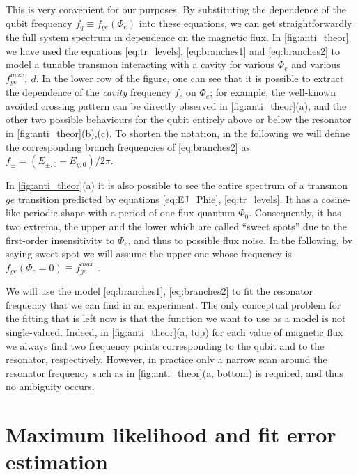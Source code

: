 \documentclass[%
 aip,
 draft,
 amsmath,amssymb,
 reprint,%
]{revtex4-1}
\begin{document}
This is very convenient for our purposes. By substituting the dependence of the qubit frequency $f_q \equiv f_{ge}(\Phi_e)$ into these equations, we can get straightforwardly the full system spectrum in dependence on the magnetic flux. In \autoref{fig:anti_theor} we have used the equations \eqref{eq:tr_levels}, \eqref{eq:branches1} and \eqref{eq:branches2} to model a tunable transmon interacting with a cavity for various $\Phi_e$ and various $f_{ge}^{max},\ d$. In the lower row of the figure, one can see that it is possible to extract the dependence of the \textit{cavity} frequency $f_c$ on $\Phi_e$; for example, the well-known avoided crossing pattern can be directly observed in \autoref{fig:anti_theor}(a), and the other two possible behaviours for the qubit entirely above or below the resonator in \autoref{fig:anti_theor}(b),(c). To shorten the notation, in the following we will define the corresponding branch frequencies of \eqref{eq:branches2} as $f_{\pm} = ( E_{\pm,0}-E_{g,0})/2\pi$.

In \autoref{fig:anti_theor}(a) it is also possible to see the entire spectrum of a transmon $ge$ transition predicted by equations \eqref{eq:EJ_Phie}, \eqref{eq:tr_levels}. It has a cosine-like periodic shape with a period of one flux quantum $\Phi_0$. Consequently, it has two extrema, the upper and the lower which are called ``sweet spots'' due to the first-order insensitivity to $\Phi_e$, and thus to possible flux noise. In the following, by saying sweet spot we will assume the upper one whose frequency is $f_{ge}(\Phi_e = 0) \equiv f^{max}_{ge}$ .

We will use the model \eqref{eq:branches1}, \eqref{eq:branches2} to fit the resonator frequency that we can find in an experiment. The only conceptual problem for the fitting that is left now is that the function we want to use as a model is not single-valued. Indeed, in \autoref{fig:anti_theor}(a, top) for each value of magnetic flux we always find two frequency points corresponding to the qubit and to the resonator, respectively. However, in practice only a narrow scan around the resonator frequency such as in \autoref{fig:anti_theor}(a, bottom) is required, and thus no ambiguity occurs. 

\section{Maximum likelihood and fit error estimation}\label{sec:ML}
	
\end{document}
